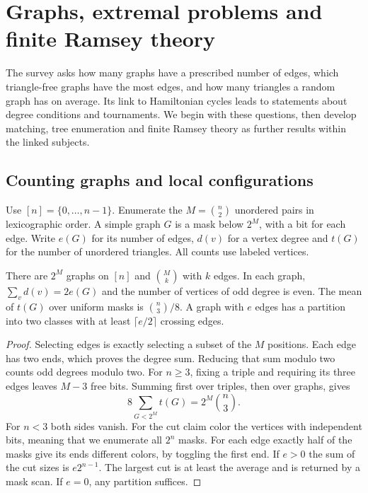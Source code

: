 \section{Graphs, extremal problems and finite Ramsey theory}
\label{sec:graphs}

The survey asks how many graphs have a prescribed number of edges, which triangle-free graphs have the most edges, and how many triangles a random graph has on average. Its link to Hamiltonian cycles leads to statements about degree conditions and tournaments. We begin with these questions, then develop matching, tree enumeration and finite Ramsey theory as further results within the linked subjects.

\subsection{Counting graphs and local configurations}

Use $[n]=\{0,\ldots,n-1\}$. Enumerate the $M=\binom n2$ unordered pairs in lexicographic order. A simple graph $G$ is a mask below $2^M$, with a bit for each edge. Write $e(G)$ for its number of edges, $d(v)$ for a vertex degree and $t(G)$ for the number of unordered triangles. All counts use labeled vertices.

\begin{proposition}\label{result19}
There are $2^M$ graphs on $[n]$ and $\binom Mk$ with $k$ edges. In each graph, $\sum_v d(v)=2e(G)$ and the number of vertices of odd degree is even. The mean of $t(G)$ over uniform masks is $\binom n3/8$. A graph with $e$ edges has a partition into two classes with at least $\lceil e/2\rceil$ crossing edges.
\end{proposition}
\begin{proof}
Selecting edges is exactly selecting a subset of the $M$ positions. Each edge has two ends, which proves the degree sum. Reducing that sum modulo two counts odd degrees modulo two. For $n\ge3$, fixing a triple and requiring its three edges leaves $M-3$ free bits. Summing first over triples, then over graphs, gives
\[
 8\sum_{G<2^M}t(G)=2^M\binom n3 .
\]
For $n<3$ both sides vanish. For the cut claim color the vertices with independent bits, meaning that we enumerate all $2^n$ masks. For each edge exactly half of the masks give its ends different colors, by toggling the first end. If $e>0$ the sum of the cut sizes is $e2^{n-1}$. The largest cut is at least the average and is returned by a mask scan. If $e=0$, any partition suffices.
\end{proof}

